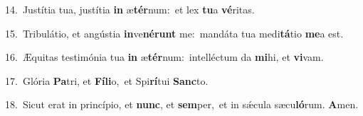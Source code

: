 {\numbfont\textcolor{\numbcolor}{14.}}~Justítia tua, justítia \textbf{in} æ\-\textbf{tér}\-num:~\star et lex \textbf{tu}\-a \textbf{vé}\-ritas.\par
{\numbfont\textcolor{\numbcolor}{15.}}~Tribulátio, et angústia \textbf{in}\-ve\-\textbf{né}\-\textbf{runt} me:~\star mandáta tua medi\-\textbf{tá}\-tio \textbf{me}\-a est.\par
{\numbfont\textcolor{\numbcolor}{16.}}~Æquitas testimónia tua \textbf{in} æ\-\textbf{tér}\-num:~\star intelléctum da \textbf{mi}\-hi, et \textbf{vi}\-vam.\par
{\numbfont\textcolor{\numbcolor}{17.}}~Glória \textbf{Pa}\-tri, et \textbf{Fí}\-\textbf{li}o,~\star et Spi\-\textbf{rí}\-tui \textbf{Sanc}\-to.\par
{\numbfont\textcolor{\numbcolor}{18.}}~Sicut erat in princípio, et \textbf{nunc}\-, et \textbf{sem}\-per,~\star et in sǽcula sæcu\-\textbf{ló}\-rum. \textbf{A}\-men.\par
